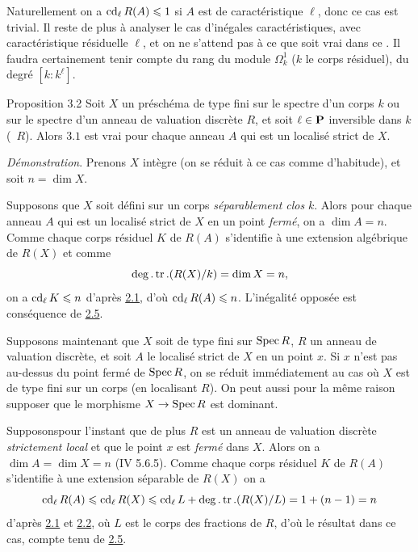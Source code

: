 \documentclass[10pt]{../fichiers-configuration-latex/smfart}
\begin{document}
Naturellement on a $\operatorname{cd}_{\ell}R(A)\leqslant 1$ si $A$ est de
caractéristique $\ell$, donc ce cas est trivial. Il reste de plus à
analyser le cas d'inégales caractéristiques, avec caractéristique
résiduelle $\ell$, et on ne s'attend pas à ce que  soit vrai dans
ce . Il faudra certainement tenir compte du rang du module
$\Omega^1_k$ ($k$ le corps résiduel), \ie du degré $[k:k^{\ell}]$. %

\begin{enonce*}{Proposition 3.2}
Soit $X$ un préschéma de type fini sur le spectre d'un corps $k$ ou
sur le spectre d'un anneau de valuation discrète $R$, et soit $\ell\in
\mathbf{P}$ inversible dans $k$ (\resp~$R$). Alors $3.1$
est vrai pour chaque anneau $A$ qui est un localisé strict de $X$.
\end{enonce*}

\emph{Démonstration}. Prenons $X$ intègre (on se réduit à ce cas comme
d'habitude), et soit $n=\dim X$.

Supposons que $X$ soit défini sur un corps \emph{séparablement clos}
$k$. Alors pour chaque anneau $A$ qui est un localisé strict de $X$ en
un point \emph{fermé}, on a $\dim A=n$. Comme chaque corps résiduel
$K$ de $R(A)$ s'identifie à une extension algébrique de $R(X)$ et
comme
$$
\deg.\operatorname{tr}.(R(X)/k)=\dim X=n{},
$$
on a $\operatorname{cd}_{\ell}K\leqslant n$ d'après \hyperref[X.thm2.1]{2.1}, d'où $\operatorname{cd}_{\ell}R(A)\leqslant
n$. L'inégalité opposée est conséquence de \hyperref[X.cor2.5]{2.5}.

Supposons maintenant que $X$ soit de type fini sur $\operatorname{Spec} R$, $R$ un
anneau de valuation discrète, et soit $A$ le localisé strict de $X$ en
un point $x$. Si $x$ n'est pas au-dessus du point fermé de $\operatorname{Spec} R$,
on se réduit immédiatement au cas où $X$ est de type fini sur un corps
(en localisant $R$). On peut aussi pour la même raison supposer que le
morphisme $X\rightarrow \operatorname{Spec} R$ est dominant.

Supposons\pageoriginale pour l'instant que de plus $R$ est un anneau
de valuation discrète \emph{strictement local} et que le point $x$ est
\emph{fermé} dans $X$. Alors on a $\dim A=\dim X=n$ (\EGA IV
5.6.5). Comme chaque corps résiduel $K$ de $R(A)$ s'identifie à une
extension séparable de $R(X)$ on a
$$
\operatorname{cd}_{\ell}R(A)\leqslant \operatorname{cd}_{\ell}R(X)\leqslant
\operatorname{cd}_{\ell}L+\deg.\operatorname{tr}.(R(X)/L)=1+(n-1)=n
$$
d'après \hyperref[X.thm2.1]{2.1} et \hyperref[X.thm2.2]{2.2}, où $L$ est le corps 
des fractions de $R$, d'où le
résultat dans ce cas, compte tenu de \hyperref[X.cor2.5]{2.5}.
\end{document}
